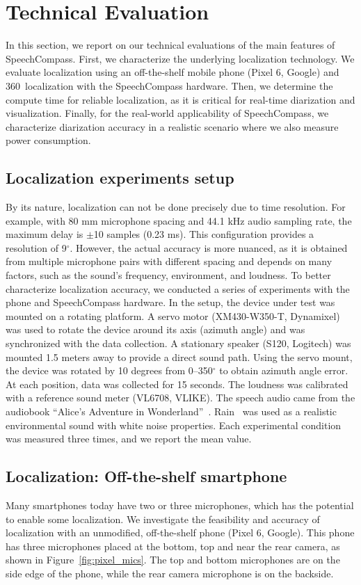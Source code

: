 \section{Technical Evaluation}\label{section:tech_eval}
In this section, we report on our technical evaluations of the main features of SpeechCompass. First, we characterize the underlying localization technology. We evaluate localization using an off-the-shelf mobile phone (Pixel 6, Google) and 360\textdegree~localization with the SpeechCompass hardware. Then, we determine the compute time for reliable localization, as it is critical for real-time diarization and visualization. Finally, for the real-world applicability of SpeechCompass, we characterize diarization accuracy in a realistic scenario where we also measure power consumption.

\subsection{Localization experiments setup}
By its nature, localization can not be done precisely due to time resolution. For example, with 80 mm microphone spacing and 44.1 kHz audio sampling rate, the maximum delay is $\pm$10 samples (0.23 ms). This configuration provides a resolution of 9$^\circ$. However, the actual accuracy is more nuanced, as it is obtained from multiple microphone pairs with different spacing and depends on many factors, such as the sound's frequency, environment, and loudness.
To better characterize localization accuracy, we conducted a series of experiments with the phone and SpeechCompass hardware. In the setup, the device under test was mounted on a rotating platform. A servo motor (XM430-W350-T, Dynamixel) was used to rotate the device around its axis (azimuth angle) and was synchronized with the data collection. 
A stationary speaker (S120, Logitech) was mounted 1.5 meters away to provide a direct sound path. 
Using the servo mount, the device was rotated by 10 degrees from 0--350$^{\circ}$ to obtain azimuth angle error. At each position, data was collected for 15 seconds. 
The loudness was calibrated with a reference sound meter (VL6708, VLIKE).
The speech audio came from the audiobook ``Alice's Adventure in Wonderland''~\cite{wonderland}. Rain~\cite{rain} was used as a realistic environmental sound with white noise properties. Each experimental condition was measured three times, and we report the mean value. 

\subsection{Localization: Off-the-shelf smartphone}
Many smartphones today have two or three microphones, which has the potential to enable some localization. We investigate the feasibility and accuracy of localization with an unmodified, off-the-shelf phone (Pixel 6, Google). This phone has three microphones placed at the bottom, top and near the rear camera, as shown in Figure~\ref{fig:pixel_mics}. The top and bottom microphones are on the side edge of the phone, while the rear camera microphone is on the backside.

